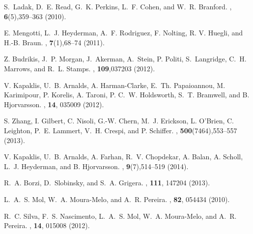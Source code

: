 \documentclass[aps,showkeys,groupedaddress]{revtex4}
\begin{document}
\begin{thebibliography}{39}
S.~Ladak, D.~E. Read, G.~K. Perkins, L.~F. Cohen, and W.~R. Branford.
, {\bf{6}}({5}),{359--363} {(2010)}.

E. Mengotti, L.~J. Heyderman, A.~F. Rodriguez, F. Nolting,
  R. V. Huegli, and H.-B. Braun.
, {\bf{7}}({1}),{68--74} {(2011)}.

Z. Budrikis, J.~P. Morgan, J.~Akerman, A.~Stein, P. Politi, S.~Langridge,
  C.~H. Marrows, and R.~L. Stamps.
, {\bf{109}},037203 {(2012)}.

V. Kapaklis, U.~B. Arnalds, A. Harman-Clarke, E.~Th.
  Papaioannou, M. Karimipour, P. Korelis, A. Taroni, P.
  C.~W. Holdsworth, S.~T. Bramwell, and B. Hjorvarsson.
, {\bf{14}}, 035009 {(2012)}.

S. Zhang, I. Gilbert, C. Nisoli, G.-W. Chern, M.~J. Erickson,
  L. O'Brien, C. Leighton, P.~E. Lammert, V.~H. Crespi, and P. Schiffer.
, {\bf{500}}({7464}),{553--557} {(2013)}.

V. Kapaklis, U.~B. Arnalds, A. Farhan, R.~V. Chopdekar, A.
  Balan, A. Scholl, L.~J. Heyderman, and B. Hjorvarsson.
, {\bf{9}}({7}),{514--519} {(2014)}.

R.~A. Borzi, D.~Slobinsky, and S.~A. Grigera.
, {\bf{111}}, 147204 {(2013)}.

L.~A.~S. Mol, W.~A. Moura-Melo, and A.~R. Pereira.
, {\bf{82}}, 054434 {(2010)}.

R.~C. Silva, F.~S. Nascimento, L.~A.~S. Mol, W.~A. Moura-Melo, and A.~R. Pereira.
, {\bf{14}}, 015008 {(2012)}.


\end{thebibliography}
\end{document}
